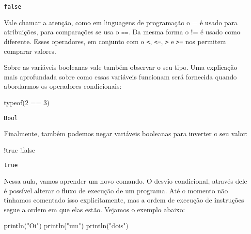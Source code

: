 \documentclass[
  letterpaper,
  DIV=11,
  numbers=noendperiod]{scrreprt}
\newenvironment{Shaded}{\begin{snugshade}}{\end{snugshade}}
\newcommand{\ConstantTok}[1]{\textcolor[rgb]{0.56,0.35,0.01}{#1}}
\newcommand{\FloatTok}[1]{\textcolor[rgb]{0.68,0.00,0.00}{#1}}
\newcommand{\FunctionTok}[1]{\textcolor[rgb]{0.28,0.35,0.67}{#1}}
\newcommand{\NormalTok}[1]{\textcolor[rgb]{0.00,0.23,0.31}{#1}}
\newcommand{\OperatorTok}[1]{\textcolor[rgb]{0.37,0.37,0.37}{#1}}
\newcommand{\StringTok}[1]{\textcolor[rgb]{0.13,0.47,0.30}{#1}}
\begin{document}
\begin{verbatim}
false
\end{verbatim}

Vale chamar a atenção, como em linguagens de programação o = é usado
para atribuições, para comparações se usa o \texttt{==}. Da mesma forma
o != é usado como diferente. Esses operadores, em conjunto com o
\texttt{\textless{}}, \texttt{\textless{}=}, \texttt{\textgreater{}} e
\texttt{\textgreater{}=} nos permitem comparar valores.

Sobre as variáveis booleanas vale também observar o seu tipo. Uma
explicação mais aprofundada sobre como essas variáveis funcionam será
fornecida quando abordarmos os operadores condicionais:

\begin{Shaded}
\begin{Highlighting}[]
\FunctionTok{typeof}\NormalTok{(}\FloatTok{2} \OperatorTok{==} \FloatTok{3}\NormalTok{)}
\end{Highlighting}
\end{Shaded}

\begin{verbatim}
Bool
\end{verbatim}

Finalmente, também podemos negar variáveis booleanas para inverter o seu
valor:

\begin{Shaded}
\begin{Highlighting}[]
\NormalTok{!}\ConstantTok{true}
\NormalTok{!}\ConstantTok{false}
\end{Highlighting}
\end{Shaded}

\begin{verbatim}
true
\end{verbatim}

Nessa aula, vamos aprender um novo comando. O desvio condicional,
através dele é possível alterar o fluxo de execução de um programa. Até
o momento não tínhamos comentado isso explicitamente, mas a ordem de
execução de instruções segue a ordem em que elas estão. Vejamos o
exemplo abaixo:

\begin{Shaded}
\begin{Highlighting}[]
\FunctionTok{println}\NormalTok{(}\StringTok{"Oi"}\NormalTok{)}
\FunctionTok{println}\NormalTok{(}\StringTok{"um"}\NormalTok{)}
\FunctionTok{println}\NormalTok{(}\StringTok{"dois"}\NormalTok{)}
\end{Highlighting}
\end{Shaded}
\end{document}

